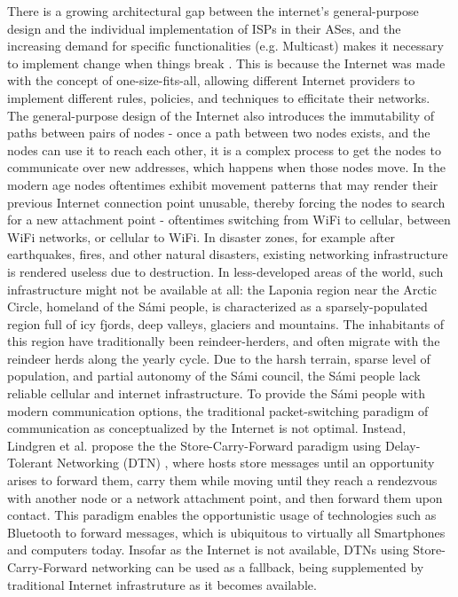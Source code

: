 There is a growing architectural gap between the internet's general-purpose design and the individual implementation of ISPs in their ASes, and the increasing demand for specific functionalities (e.g. Multicast) makes it necessary to implement change when things break \cite{handley}. This is because the Internet was made with the concept of one-size-fits-all, allowing different Internet providers to implement different rules, policies, and techniques to efficitate their networks.
The general-purpose design of the Internet also introduces the immutability of paths between pairs of nodes - once a path between two nodes exists, and the nodes can use it to reach each other, it is a complex process to get the nodes to communicate over new addresses, which happens when those nodes move. In the modern age nodes oftentimes exhibit movement patterns that may render their previous Internet connection point unusable, thereby forcing the nodes to search for a new attachment point - oftentimes switching from WiFi to cellular, between WiFi networks, or cellular to WiFi. In disaster zones, for example after earthquakes, fires, and other natural disasters, existing networking infrastructure is rendered useless due to destruction.
In less-developed areas of the world, such infrastructure might not be available at all: the Laponia region near the Arctic Circle, homeland of the Sámi people, is characterized as a sparsely-populated region full of icy fjords, deep valleys, glaciers and mountains.
The inhabitants of this region have traditionally been reindeer-herders, and often migrate with the reindeer herds along the yearly cycle. Due to the harsh terrain, sparse level of population, and partial autonomy of the Sámi council, the Sámi people lack reliable cellular and internet infrastructure. To provide the Sámi people with modern communication options, the traditional packet-switching paradigm of communication as conceptualized by the Internet is not optimal.
Instead, Lindgren et al. propose the the Store-Carry-Forward paradigm using Delay-Tolerant Networking (DTN) \cite{sami}, where hosts store messages until an opportunity arises to forward them, carry them while moving until they reach a rendezvous with another node or a network attachment point, and then forward them upon contact. This paradigm enables the opportunistic usage of technologies such as Bluetooth to forward messages, which is ubiquitous to virtually all Smartphones and computers today.
Insofar as the Internet is not available, DTNs using Store-Carry-Forward networking can be used as a fallback, being supplemented by traditional Internet infrastruture as it becomes available.
